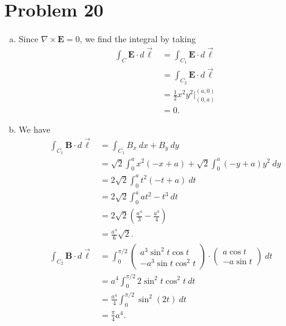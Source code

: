 \documentclass[10pt]{mypackage}
\begin{document}
\section{Problem 20}%
\begin{enumerate}[(a)]
  \item Since $\nabla \times \mathbf{E} = 0$, we find the integral by taking
    \begin{align*}
      \int_{C}^{} \mathbf{E}\cdot d\vec{\ell} &= \int_{C_1}^{} \mathbf{E}\cdot d\vec{\ell}\\
                                              &= \int_{C_2}^{} \mathbf{E}\cdot d\vec{\ell}\\
                                              &= \frac{1}{2}x^2y^2\bigr\vert_{(0,a)}^{(a,0)}\\
                                              &= 0.
    \end{align*}
  \item We have
    \begin{align*}
      \int_{C_1}^{} \mathbf{B}\cdot d\vec{\ell} &= \int_{C_1}^{} B_x\:dx + B_y\:dy\\
                                                &= \sqrt{2}\int_{0}^{a}x^2\left(-x+a\right) + \sqrt{2}\int_{0}^{a} \left(-y + a\right)y^2\:dy\\
                                                &= 2\sqrt{2}\int_{0}^{a} t^2(-t + a)\:dt\\
                                                &= 2\sqrt{2}\int_{0}^{a} at^2 - t^3\:dt\\
                                                &= 2\sqrt{2}\left(\frac{a^4}{3} - \frac{a^4}{4}\right)\\
                                                &= \frac{a^4}{6}\sqrt{2}.\\
      \int_{C_2}^{} \mathbf{B}\cdot d\vec{\ell} &= \int_{0}^{\pi/2} \begin{pmatrix}a^3\sin^2t\cos t \\ -a^3\sin t \cos^2 t\end{pmatrix}\cdot \begin{pmatrix}a \cos t \\ -a\sin t\end{pmatrix}\:dt\\
                                                &= a^4\int_{0}^{\pi/2} 2\sin^2 t \cos ^2 t\:dt\\
                                                &= \frac{a^4}{4}\int_{0}^{\pi/2} \sin^2\left(2t\right)\:dt\\
                                                &= \frac{\pi}{4}a^4.
    \end{align*}
\end{enumerate}
\end{document}
